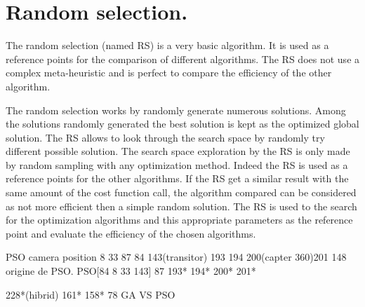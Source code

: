 

\section{Random selection.}

The random selection (named RS) is a very basic algorithm. It is used as a reference points for the comparison of different algorithms. The RS does not use a complex meta-heuristic and is perfect to compare the efficiency of the other algorithm.

The random selection works by randomly generate numerous solutions. Among the solutions randomly generated the best solution is kept as the optimized global solution. The RS allows to look through the search space by randomly try different  possible solution. The search space exploration by the RS is only made by random sampling with any optimization method. 
Indeed the RS is used as a reference points for the other algorithms. If the RS get a similar result with the same amount of the cost function call, the algorithm compared can be considered as not more efficient then a simple random solution. 
The RS is used to the search for the optimization algorithms and this appropriate parameters as the reference point and evaluate the efficiency of the chosen algorithms.


  

PSO camera position 
8 33 87 84 143(transitor) 193 194 200(capter 360)201
148 origine de PSO. 
PSO[84 8 33 143] 87 193* 194* 200* 201* 

228*(hibrid) 161* 158* 78 GA VS PSO

